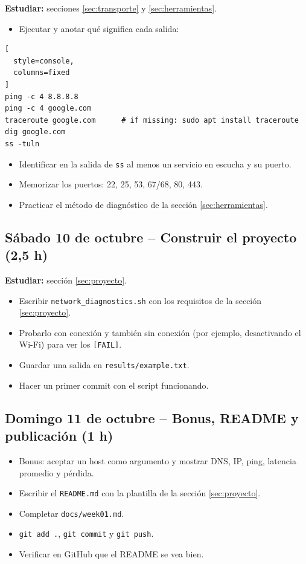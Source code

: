 \documentclass[11pt,a4paper]{article}
\theoremstyle{definition}
\theoremstyle{remark}
\newcommand{\cmd}[1]{\texttt{#1}}
\begin{document}
\textbf{Estudiar:} secciones \ref{sec:transporte} y \ref{sec:herramientas}.

\begin{itemize}[label=$\square$]
  \item Ejecutar y anotar qué significa cada salida:
\end{itemize}

\begin{lstlisting}[
  style=console,
  columns=fixed
]
ping -c 4 8.8.8.8
ping -c 4 google.com
traceroute google.com      # if missing: sudo apt install traceroute
dig google.com
ss -tuln
\end{lstlisting}

\begin{itemize}[label=$\square$]
  \item Identificar en la salida de \cmd{ss} al menos un servicio en escucha y su puerto.
  \item Memorizar los puertos: 22, 25, 53, 67/68, 80, 443.
  \item Practicar el método de diagnóstico de la sección \ref{sec:herramientas}.
\end{itemize}

\subsection{Sábado 10 de octubre -- Construir el proyecto (2,5 h)}

\textbf{Estudiar:} sección \ref{sec:proyecto}.

\begin{itemize}[label=$\square$]
  \item Escribir \texttt{network\_diagnostics.sh} con los requisitos de la sección \ref{sec:proyecto}.
  \item Probarlo con conexión y también sin conexión (por ejemplo, desactivando el Wi-Fi) para ver los \texttt{[FAIL]}.
  \item Guardar una salida en \texttt{results/example.txt}.
  \item Hacer un primer commit con el script funcionando.
\end{itemize}

\subsection{Domingo 11 de octubre -- Bonus, README y publicación (1 h)}

\begin{itemize}[label=$\square$]
  \item Bonus: aceptar un host como argumento y mostrar DNS, IP, ping, latencia promedio y pérdida.
  \item Escribir el \texttt{README.md} con la plantilla de la sección \ref{sec:proyecto}.
  \item Completar \texttt{docs/week01.md}.
  \item \texttt{git add .}, \texttt{git commit} y \texttt{git push}.
  \item Verificar en GitHub que el README se vea bien.
\end{itemize}
\end{document}

